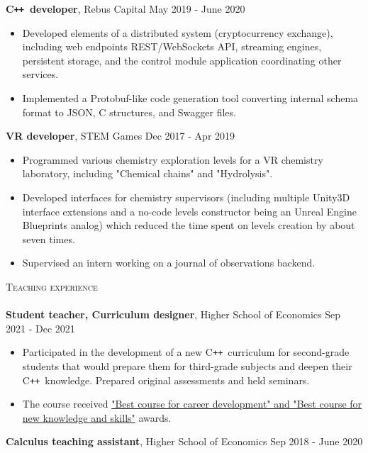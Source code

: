 \documentclass[a4paper]{article}
\newcommand{\lineunder} { \vspace*{-8pt} \\ \hspace*{-18pt} \hrulefill \\ }
\newcommand{\header} [1] { {\hspace*{-18pt}\vspace*{6pt} \textsc{#1}} \vspace*{-6pt} \lineunder }
\newcommand{\CC}{C\texttt{++}}
\begin{document}
\textbf{\CC\ developer}, Rebus Capital \hfill May 2019 - June 2020 \\

\begin{itemize}
    \item Developed elements of a distributed system (cryptocurrency exchange),
        including web endpoints REST/WebSockets API, streaming engines, persistent storage,
        and the control module application coordinating other services.
    \item Implemented a Protobuf-like code generation tool converting internal schema format
        to JSON, C structures, and Swagger files.
\end{itemize}

\textbf{VR developer}, STEM Games \hfill Dec 2017 - Apr 2019 \\

\begin{itemize}
    \item Programmed various chemistry exploration levels for a VR chemistry
        laboratory, including "Chemical chains" and "Hydrolysis".
    \item Developed interfaces for chemistry supervisors (including multiple Unity3D interface
        extensions and a no-code levels constructor being
        an Unreal Engine Blueprints analog) which reduced the time spent on  levels creation
        by about seven times.
    \item Supervised an intern working on a journal of observations backend.
\end{itemize}

\header{Teaching experience}

\textbf{Student teacher, Curriculum designer}, Higher School of Economics 
\hfill Sep 2021 - Dec 2021 \\

\begin{itemize}
    \item Participated in the development of a new \CC\ curriculum for second-grade students
        that would prepare them for third-grade subjects and deepen their \CC\ knowledge.
        Prepared original assessments and held seminars.
    \item The course received \href{https://www.hse.ru/en/edu/courses/470902539}
        {"Best course for career development" and "Best course for new knowledge and skills"}
        awards.
\end{itemize}

\textbf{Calculus teaching assistant},
Higher School of Economics 
\hfill Sep 2018 - June 2020 \\
\end{document}

